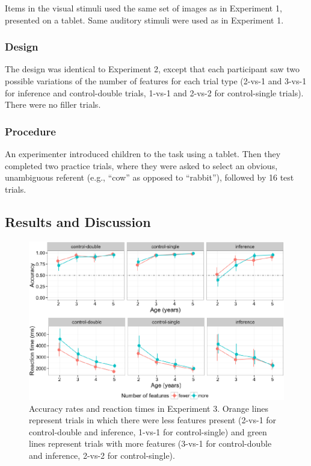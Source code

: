 \documentclass[a4paper,man,apacite,floatsintext]{apa6}
\newenvironment{CodeChunk}{}{}
\begin{document}
Items in the visual stimuli used the same set of images as in Experiment
1, presented on a tablet. Same auditory stimuli were used as in
Experiment 1.

\subsubsection{Design}\label{design}

The design was identical to Experiment 2, except that each participant
saw two possible variations of the number of features for each trial
type (2-vs-1 and 3-vs-1 for inference and control-double trials, 1-vs-1
and 2-vs-2 for control-single trials). There were no filler trials.

\subsubsection{Procedure}\label{procedure-1}

An experimenter introduced children to the task using a tablet. Then
they completed two practice trials, where they were asked to select an
obvious, unambiguous referent (e.g., ``cow'' as opposed to ``rabbit''),
followed by 16 test trials.

\subsection{Results and Discussion}\label{results-and-discussion-2}

\begin{CodeChunk}
\begin{figure}[H]

{\centering \includegraphics{figs/ipaccrt-1} 

}

\caption[Accuracy rates and reaction times in Experiment 3]{Accuracy rates and reaction times in Experiment 3. Orange lines represent trials in which there were less features present (2-vs-1 for control-double and inference, 1-vs-1 for control-single) and green lines represent trials with more features (3-vs-1 for control-double and inference, 2-vs-2 for control-single).}\label{fig:ipaccrt}
\end{figure}
\end{CodeChunk}
\end{document}
